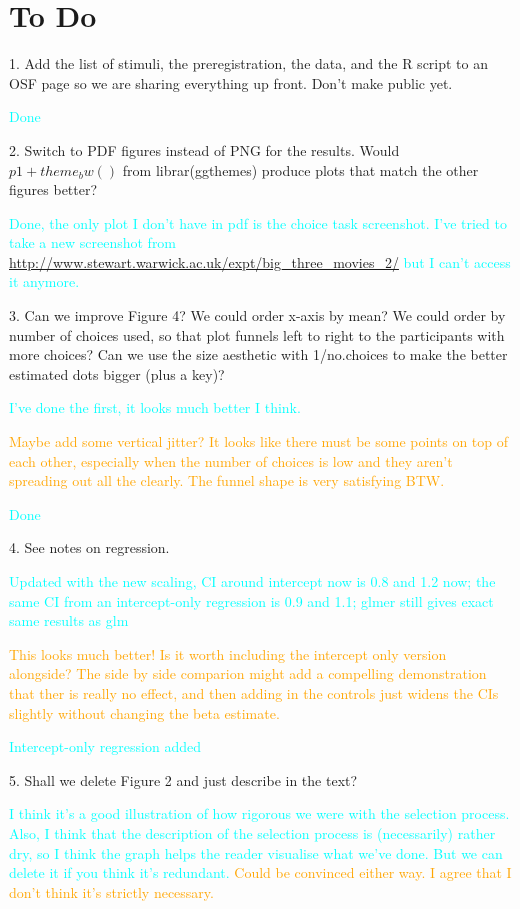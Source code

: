 \documentclass[12pt, a4paper]{article}
\newcommand{\AT}[1] {{\textcolor{cyan}{#1}}}
\newcommand{\TM}[1] {{\textcolor{orange}{#1}}}
\begin{document}
\section{To Do}


1. Add the list of stimuli, the preregistration, the data, and the R script to an OSF page so we are sharing everything up front. Don't make public yet. 


\AT{Done}


2. Switch to PDF figures instead of PNG for the results. Would $p1 + theme_bw()$ from librar(ggthemes) produce plots that match the other figures better?

\AT{Done, the only plot I don't have in pdf is the choice task screenshot. I've tried to take a new screenshot from \url{http://www.stewart.warwick.ac.uk/expt/big_three_movies_2/} but I can't access it anymore.}

3. Can we improve Figure 4? We could order x-axis by mean? We could order by number of choices used, so that plot funnels left to right to the participants with more choices? Can we use the size aesthetic with 1/no.choices to make the better estimated dots bigger (plus a key)?

\AT{I've done the first, it looks much better I think.}

\TM{Maybe add some vertical jitter? It looks like there must be some points on top of each other, especially when the number of choices is low and they aren't spreading out all the clearly. The funnel shape is very satisfying BTW.}


\AT{Done}

4. See notes on regression.

\AT{Updated with the new scaling, CI around intercept now is 0.8 and 1.2 now; the same CI from an intercept-only regression is 0.9 and 1.1; glmer still gives exact same results as glm}



\TM{This looks much better! Is it worth including the intercept only version alongside? The side by side comparion might add a compelling demonstration that ther is really no effect, and then adding in the controls just widens the CIs slightly without changing the beta estimate.}

\AT{Intercept-only regression added}



5. Shall we delete Figure 2 and just describe in the text?

\AT{I think it's a good illustration of how rigorous we were with the selection process. Also, I think that the description of the selection process is (necessarily) rather dry, so I think the graph helps the reader visualise what we've done. But we can delete it if you think it's redundant.}
\TM{Could be convinced either way. I agree that I don't think it's strictly necessary.}
\end{document}
